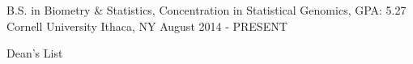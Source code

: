 

\begin{cventries}

  \cventry
    {B.S. in Biometry \& Statistics, Concentration in Statistical Genomics, GPA: 5.27} %
    {Cornell University} %
    {Ithaca, NY} %
    {August 2014 - PRESENT} %
    {
      \begin{cvitems} %
        \item {Dean's List}
      \end{cvitems}
    }
\end{cventries}
